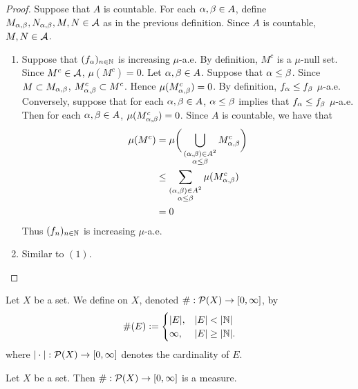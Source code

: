 \documentclass{book}
\begin{document}
	\begin{proof} Suppose that $A$ is countable. For each $\alpha, \beta \in A$, define $M_{\alpha, \beta},N_{\alpha, \beta},M,N \in \mathcal{A}$ as in the previous definition. Since $A$ is countable, $M,N \in \mathcal{A}$. 
		\begin{enumerate}
			\item Suppose that $(f_{\alpha})_{n \in \mathbb{N}}$ is increasing $\mu$-a.e. By definition, $M^c$ is a $\mu$-null set. Since $M^c \in \mathcal{A}$, $\mu(M^c) = 0$. Let $\alpha, \beta \in A$. Suppose that $\alpha \leq \beta$. Since $M \subset M_{\alpha, \beta}$, $M_{\alpha, \beta}^c \subset M^c$. Hence $\mu(M_{\alpha, \beta}^c) = 0$. By definition, $f_{\alpha} \leq f_{\beta}$ $\mu$-a.e.\\
			Conversely, suppose that for each $\alpha, \beta \in A$, $\alpha \leq \beta$ implies that $f_{\alpha} \leq f_{\beta}$ $\mu$-a.e. Then for each $\alpha, \beta \in A$, $\mu(M_{\alpha, \beta}^c) = 0$. Since $A$ is countable, we have that
			\begin{align*}
				\mu(M^c) 
				& = \mu \bigg( \bigcup\limits_{\substack{(\alpha, \beta) \in A^2 \\ \alpha \leq \beta}} M_{\alpha, \beta}^c \bigg) \\
				& \leq \sum\limits_{\substack{(\alpha, \beta) \in A^2 \\ \alpha \leq \beta}} \mu(M_{\alpha, \beta}^c) \\
				& = 0
			\end{align*}
			Thus $(f_n)_{n \in \mathbb{N}}$ is increasing $\mu$-a.e.
			\item Similar to $(1)$.
		\end{enumerate}
	\end{proof}

	\begin{defn} 
		Let $X$ be a set. We define  on $X$, denoted $\#: \mathcal{P}(X) \rightarrow [0,\infty]$, by
		\[
		\# (E) \vcentcolon= 
		\begin{cases}
			|E|, & |E| < |\mathbb{N}| \\
			\infty, & |E| \geq |\mathbb{N}|.
		\end{cases}
		\] 
		where $|\cdot|: \mathcal{P}(X) \rightarrow [0,\infty]$ denotes the cardinality of $E$. 
	\end{defn}

	\begin{ex}  
		Let $X$ be a set. Then $\#: \mathcal{P}(X) \rightarrow [0,\infty]$ is a measure. \\
		\\
	\end{ex}
\end{document}
